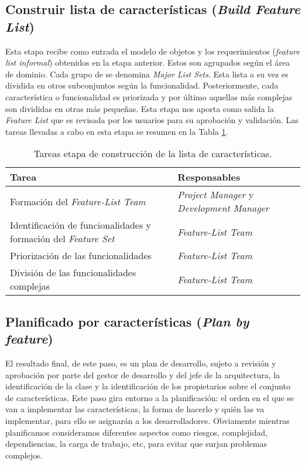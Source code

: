 \documentclass[11pt]{article}
\begin{document}
\subsection {Construir lista de características (\textit{Build Feature List})}

Esta etapa recibe como entrada el modelo de objetos y los requerimientos (\textit{feature list informal}) obtenidos en la etapa anterior.  Estos son agrupados según el área de dominio. Cada grupo de se denomina \textit{Major List Sets}. Esta lista a su vez es dividida en otros subconjuntos según la funcionalidad. Posteriormente, cada característica o funcionalidad es priorizada y por último aquellas más complejas son divididas en otras más pequeñas. Esta etapa nos aporta como salida la \textit{Feature List} que es revisada por los usuarios para su aprobación y validación. Las tareas llevadas a cabo en esta etapa se resumen en la Tabla \ref{fig:BFL}. \\

\begin{table}[H]
  \centering
\begin{tabular}{ |p{6cm}|p{6cm}|  }
	\hline
	Tarea & Responsables \\
	\hline
	Formación del
	\textit{Feature-List Team}  &    \textit{Project
		Manager} y 
	\textit{	Development
		Manager}\\
	Identificación de funcionalidades y formación del \textit{Feature Set}  & \textit{Feature-List Team}\\
	Priorización de las funcionalidades &  \textit{Feature-List Team}\\
	División de las funcionalidades complejas    & \textit{Feature-List Team}\\
	\hline
\end{tabular}
\caption{Tareas etapa de construcción de la lista de características.}\label{fig:BFL}
\end{table}

\subsection{Planificado por características (\textit{Plan by feature})}
El resultado final, de este paso, es un plan de desarrollo, sujeto a revisión y aprobación por parte del gestor de desarrollo y del jefe de la arquitectura, la identificación de la clase y la identificación de los propietarios sobre el conjunto de características.
Este paso gira entorno a la planificación: el orden en el que se van a implementar las características, la forma de hacerlo y quién las va implementar, para ello se asignarán a los desarrolladores.
Obviamente mientras planificamos consideramos diferentes aspectos como riesgos, complejidad, dependiencias, la carga de trabajo, etc, para evitar que surjan problemas complejos.
\end{document}

